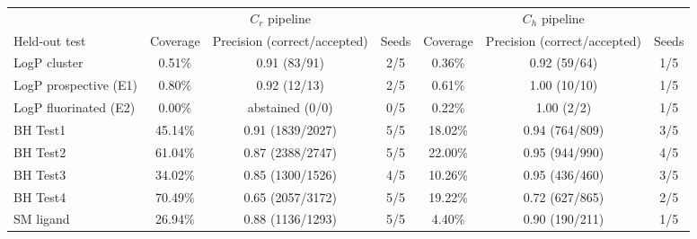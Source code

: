 \begin{tabular}{@{}lcccccc@{}}
\toprule
 & \multicolumn{3}{c}{$C_r$ pipeline} & \multicolumn{3}{c}{$C_h$ pipeline} \\
\cmidrule(lr){2-4}\cmidrule(lr){5-7}
Held-out test & Coverage & Precision (correct/accepted) & Seeds & Coverage & Precision (correct/accepted) & Seeds \\
\midrule
LogP cluster & 0.51\% & 0.91 (83/91) & 2/5 & 0.36\% & 0.92 (59/64) & 1/5 \\
LogP prospective (E1) & 0.80\% & 0.92 (12/13) & 2/5 & 0.61\% & 1.00 (10/10) & 1/5 \\
LogP fluorinated (E2) & 0.00\% & abstained (0/0) & 0/5 & 0.22\% & 1.00 (2/2) & 1/5 \\
BH Test1 & 45.14\% & 0.91 (1839/2027) & 5/5 & 18.02\% & 0.94 (764/809) & 3/5 \\
BH Test2 & 61.04\% & 0.87 (2388/2747) & 5/5 & 22.00\% & 0.95 (944/990) & 4/5 \\
BH Test3 & 34.02\% & 0.85 (1300/1526) & 4/5 & 10.26\% & 0.95 (436/460) & 3/5 \\
BH Test4 & 70.49\% & 0.65 (2057/3172) & 5/5 & 19.22\% & 0.72 (627/865) & 2/5 \\
SM ligand & 26.94\% & 0.88 (1136/1293) & 5/5 & 4.40\% & 0.90 (190/211) & 1/5 \\
\bottomrule
\end{tabular}